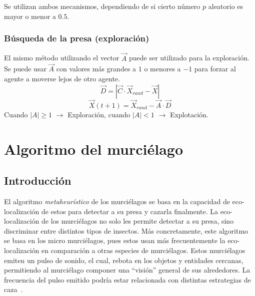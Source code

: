 Se utilizan ambos mecanismos, dependiendo de si cierto número $p$ aleatorio es mayor o menor a $0.5$.

\subsubsection{Búsqueda de la presa (exploración)}
El mismo método utilizando el vector $\vec{A}$ puede ser utilizado para la exploración. Se puede usar $\vec{A}$ con valores más grandes a $1$ o menores a $-1$ para forzar al agente a moverse lejos de otro agente.
\begin{equation}
    \vec{D}=|\vec{C}\cdot\vec{X}_{rand}-\vec{X}|
\end{equation}
\begin{equation}
    \vec{X}(t+1)=\vec{X}_{rand}-\vec{A}\cdot\vec{D}
\end{equation}
Cuando $|A|\geq 1$ $\rightarrow$ Exploración, cuando $|A|<1$ $\rightarrow$ Explotación.

\section{Algoritmo del murciélago}
\subsection{Introducción}
El algoritmo \textit{metaheurístico} de los murciélagos se basa en la capacidad de eco-localización de estos para detectar a su presa y cazarla finalmente. La eco-localización de los murciélagos no solo les permite detectar a su presa, sino discriminar entre distintos tipos de insectos. Más concretamente, este algoritmo se basa en los micro murciélagos, pues estos usan más frecuentemente la eco-localización en comparación a otras especies de murciélagos. Estos murciélagos emiten un pulso de sonido, el cual, rebota en los objetos y entidades cercanas, permitiendo al murciélago componer una ``visión'' general de sus alrededores. La frecuencia del pulso emitido podría estar relacionada con distintas estrategias de caza~\cite{yang_new_2010}.
